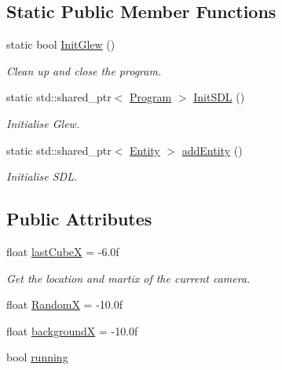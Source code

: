 \subsection*{Static Public Member Functions}
\begin{DoxyCompactItemize}
\item 
static bool \mbox{\hyperlink{class_aspect_1_1_engine_1_1_program_ad43c625aadbe66c58cf2c89f3aea0b67}{Init\+Glew}} ()
\begin{DoxyCompactList}\small\item\em Clean up and close the program. \end{DoxyCompactList}\item 
static std\+::shared\+\_\+ptr$<$ \mbox{\hyperlink{class_aspect_1_1_engine_1_1_program}{Program}} $>$ \mbox{\hyperlink{class_aspect_1_1_engine_1_1_program_a0defbfe96a9811ed16b1d02d786caba0}{Init\+S\+DL}} ()
\begin{DoxyCompactList}\small\item\em Initialise Glew. \end{DoxyCompactList}\item 
static std\+::shared\+\_\+ptr$<$ \mbox{\hyperlink{class_aspect_1_1_engine_1_1_entity}{Entity}} $>$ \mbox{\hyperlink{class_aspect_1_1_engine_1_1_program_a937df3d57a425f25be2f40c3dcaff072}{add\+Entity}} ()
\begin{DoxyCompactList}\small\item\em Initialise S\+DL. \end{DoxyCompactList}\end{DoxyCompactItemize}
\subsection*{Public Attributes}
\begin{DoxyCompactItemize}
\item 
float \mbox{\hyperlink{class_aspect_1_1_engine_1_1_program_ab387e4928975cfedaa081f8fc7b61bc1}{last\+CubeX}} = -\/6.\+0f
\begin{DoxyCompactList}\small\item\em Get the location and martix of the current camera. \end{DoxyCompactList}\item 
float \mbox{\hyperlink{class_aspect_1_1_engine_1_1_program_ad2cae5125b23074393f6ad5681a24fa0}{RandomX}} = -\/10.\+0f
\item 
float \mbox{\hyperlink{class_aspect_1_1_engine_1_1_program_a5779fcff2573e7c5e92878c964f5a701}{backgroundX}} = -\/10.\+0f
\item 
bool \mbox{\hyperlink{class_aspect_1_1_engine_1_1_program_a76e0a879e2a03987fc7242275d311579}{running}}
\end{DoxyCompactItemize}
